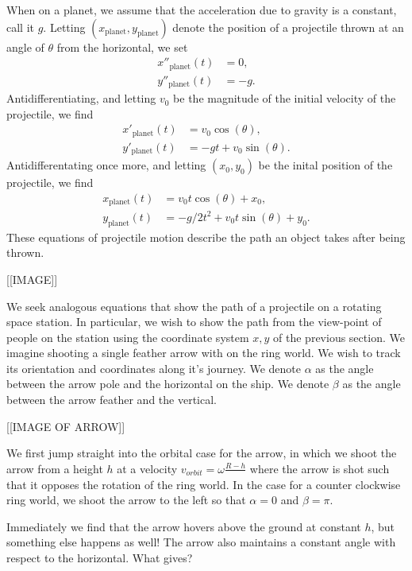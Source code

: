 \documentclass{amsart}
\theoremstyle{definition}
\begin{document}
When on a planet, we assume that the acceleration due to gravity is a
constant, call it $g$. Letting
$(x_{\mathrm{planet}},y_{\mathrm{planet}})$ denote the position
of a projectile thrown at an angle of $\theta$ from the horizontal, we
set
\begin{align*}
  x''_{\mathrm{planet}}(t) &= 0,\\
  y''_{\mathrm{planet}}(t) &= -g.
\end{align*}
Antidifferentiating, and letting $v_0$ be the magnitude of the initial
velocity of the projectile, we find
\begin{align*}
  x'_{\mathrm{planet}}(t) &= v_0 \cos(\theta),\\
  y'_{\mathrm{planet}}(t) &= -g t  + v_0 \sin(\theta).
\end{align*}
Antidifferentating once more, and letting $(x_0,y_0)$ be the
inital position of the projectile, we find
\begin{align*}
  x_{\mathrm{planet}}(t) &=  v_0 t \cos(\theta)  + x_0,\\
  y_{\mathrm{planet}}(t) &=  -g/2 t^2 + v_0 t \sin(\theta)  + y_0.
\end{align*}
These equations of projectile motion describe the path an object takes
after being thrown.

[[IMAGE]]

We seek analogous equations that show the path of a projectile on a
rotating space station. In particular, we wish to show the path from
the view-point of people on the station using the coordinate system $x,y$ of the previous
section. 
\newline
We imagine shooting a single feather arrow with on the ring world. We wish to track its orientation and coordinates along it's journey. We denote $\alpha$ as the 
angle between the arrow pole and the horizontal on the ship. We denote $\beta$ as the angle between the arrow feather and the vertical. 

[[IMAGE OF ARROW]]

We first jump straight into the orbital case for the arrow, in which we shoot the arrow
 from a height $h$ at a velocity $v_{orbit} = \omega \frac{R-h}{}$ where the arrow is 
 shot such that it opposes the rotation of the ring world. In the case for a counter clockwise ring world, we 
 shoot the arrow to the left so that $\alpha=0$ and $\beta = \pi$.

Immediately we find that the arrow hovers above the ground at constant $h$, but something else happens as well! The arrow also maintains a constant angle with respect to the horizontal.
What gives? 
\end{document}

